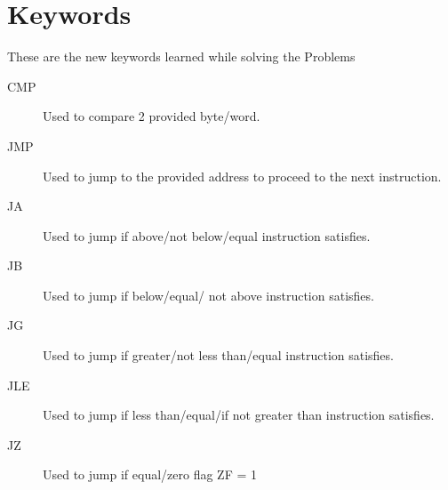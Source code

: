 \documentclass[12pt]{article}
\begin{document}







\section*{Keywords}
These are the new keywords learned while solving the Problems
\begin{description}
    \item[CMP] Used to compare 2 provided byte/word.
    \item[JMP] Used to jump to the provided address to proceed to the next instruction.
    \item[JA] Used to jump if above/not below/equal instruction satisfies.
    \item[JB] Used to jump if below/equal/ not above instruction satisfies.
    \item[JG] Used to jump if greater/not less than/equal instruction satisfies.
    \item[JLE] Used to jump if less than/equal/if not greater than instruction satisfies.
    \item[JZ] Used to jump if equal/zero flag ZF = 1


\end{description}
\end{document}
